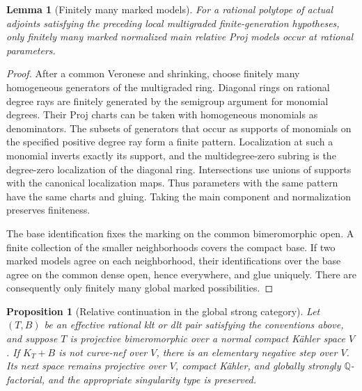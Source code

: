 \documentclass[11pt,letterpaper]{article}
\newcommand{\Q}{\mathbb{Q}}
\newtheorem{proposition}[theorem]{Proposition}
\newtheorem{lemma}[theorem]{Lemma}
\theoremstyle{definition}
\theoremstyle{remark}
\begin{document}
\begin{lemma}[Finitely many marked models]
\label{bir:finite-models}
For a rational polytope of actual adjoints satisfying the preceding
local multigraded finite-generation hypotheses, only finitely many
marked normalized main relative Proj models occur at rational
parameters.
\end{lemma}

\begin{proof}
After a common Veronese and shrinking, choose finitely many homogeneous
generators of the multigraded ring.  Diagonal rings on rational degree
rays are finitely generated by the semigroup argument for monomial
degrees.  Their Proj charts can be taken with homogeneous monomials as
denominators.  The subsets of generators that occur as supports of
monomials on the specified positive degree ray form a finite pattern.
Localization at such a monomial inverts exactly its support, and the
multidegree-zero subring is the degree-zero localization of the
diagonal ring.  Intersections use unions of supports with the
canonical localization maps.  Thus parameters with the same pattern
have the same charts and gluing.  Taking the main component and
normalization preserves finiteness.

The base identification fixes the marking on the common bimeromorphic
open.  A finite collection of the smaller neighborhoods covers the
compact base.  If two marked models agree on each neighborhood, their
identifications over the base agree on the common dense open, hence
everywhere, and glue uniquely.  There are consequently only finitely
many global marked possibilities.
\end{proof}

\begin{proposition}[Relative continuation in the global strong category]
\label{bir:continuation}
Let $(T,B)$ be an effective rational klt or dlt pair satisfying the
conventions above, and suppose $T$ is projective bimeromorphic over a
normal compact K\"ahler space $V$.  If $K_T+B$ is not curve-nef over
$V$, there is an elementary negative step over $V$.  Its next space
remains projective over $V$, compact K\"ahler, and globally strongly
$\Q$-factorial, and the appropriate singularity type is preserved.
\end{proposition}
\end{document}
